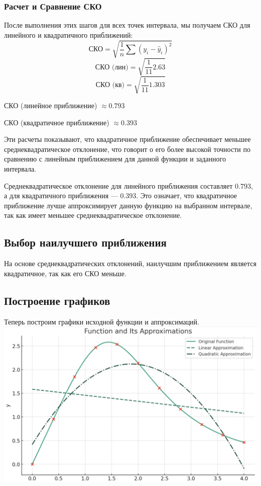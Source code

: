 \documentclass{article}
\begin{document}
      
      \subsubsection{Расчет и Сравнение СКО}

            После выполнения этих шагов для всех точек интервала, мы получаем СКО для линейного и квадратичного приближений:
            \[
            \text{СКО} = \sqrt{\frac{1}{n} \sum (y_i - \hat{y}_i)^2}
            \]
            \[
            \text{СКО (лин)} = \sqrt{\frac{1}{11} 2.63}
            \]
            \[
            \text{СКО (кв)} = \sqrt{\frac{1}{11}1.303 }
            \]

            СКО (линейное приближение) $\approx 0.793$ 
            
            СКО (квадратичное приближение) $\approx 0.393$

            Эти расчеты показывают, что квадратичное приближение обеспечивает меньшее среднеквадратическое отклонение, что говорит о его более высокой точности по сравнению с линейным приближением для данной функции и заданного интервала.

            Среднеквадратическое отклонение для линейного приближения составляет $0.793$, а для квадратичного приближения — $0.393$. Это означает, что квадратичное приближение лучше аппроксимирует данную функцию на выбранном интервале, так как имеет меньшее среднеквадратическое отклонение.

      \subsection{Выбор наилучшего приближения}

            На основе среднеквадратических отклонений, наилучшим приближением является квадратичное, так как его СКО меньше.

      \subsection{Построение графиков}

            Теперь построим графики исходной функции и аппроксимаций.  
            \\
            \includegraphics[scale=0.4]{hand_approx.png} 
      
\end{document}
